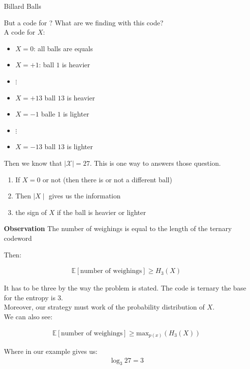 \begin{parag}{Billard Balls}
\begin{subparag}{But a code for ?}
    What are we finding with this code?\\
    A code for $X$:
    \begin{itemize}
        \item $X = 0$: all balls are equals
        \item $X = +1$: ball $1$ is heavier
        \item $\vdots$ 
        \item $X = +13$ ball $13$ is heavier
        \item $X = -1$ balle $1$ is lighter
        \item $\vdots$
        \item $X = -13$ ball $13$ is lighter
    \end{itemize}
    Then we know that $ \mid \mathcal{X} \mid = 27$. This is one way to answers those question.
    \begin{enumerate}
        \item If $X = 0$ or not (then there is or not a different ball)
        \item Then  $ \mid X \mid $ gives us the information
        \item the sign of $X$ if the ball is heavier or lighter
    \end{enumerate}
    \textbf{Observation}
    The number of weighings  is equal to the length of the ternary codeword
\end{subparag}
Then:
\begin{theoreme}
    \begin{align*}
        \mathbb{E}[ \text{number of weighings}] \geq H_3(X)
    \end{align*}
\end{theoreme}
It has to be three by the way the problem is stated. The code is ternary  the base for the entropy is $3$.\\
Moreover, our strategy must work  of the probability distribution of $X$.
\\
We can also see:
\begin{theoreme}
    \begin{align*}
        \mathbb{E}[ \text{number of weighings}] \geq  \text{max}_{p(x)}(H_3(X))
    \end{align*}
\end{theoreme}
Where in our example gives us:
\begin{align*}
    \log_3 27 = 3
\end{align*}
\begin{framedremark}

\end{framedremark}
\end{parag}
